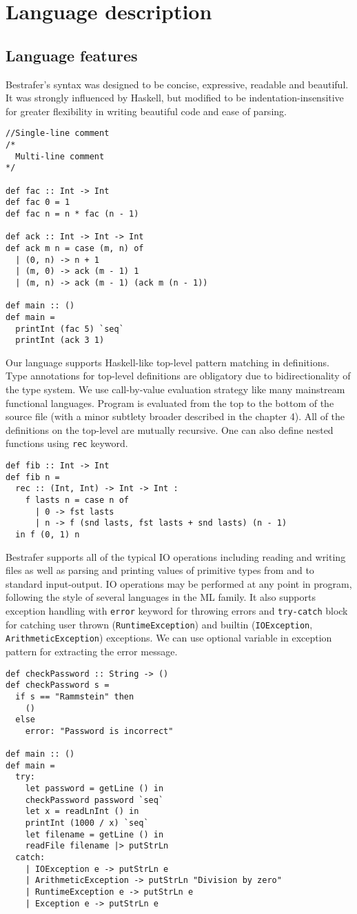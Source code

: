 \documentclass[declaration,shortabstract,english]{iithesis}
\begin{document}
\chapter{Language description}
\section{Language features}
Bestrafer's syntax was designed to be concise, expressive, readable and beautiful.
It was strongly influenced by Haskell, but modified to be indentation-insensitive for greater
flexibility in writing beautiful code and ease of parsing.
\begin{verbatim}
//Single-line comment
/*
  Multi-line comment
*/

def fac :: Int -> Int
def fac 0 = 1
def fac n = n * fac (n - 1)

def ack :: Int -> Int -> Int
def ack m n = case (m, n) of
  | (0, n) -> n + 1
  | (m, 0) -> ack (m - 1) 1
  | (m, n) -> ack (m - 1) (ack m (n - 1))

def main :: ()
def main =
  printInt (fac 5) `seq`
  printInt (ack 3 1)
\end{verbatim}
Our language supports Haskell-like top-level pattern matching in definitions. Type annotations
for top-level definitions are obligatory due to bidirectionality of the type system.
We use call-by-value evaluation strategy like many mainstream functional languages.
Program is evaluated from the top to the bottom of the source file
(with a minor subtlety broader described in the chapter 4). All of the definitions on the top-level
are mutually recursive. One can also define nested functions using \verb+rec+ keyword.
\begin{verbatim}
def fib :: Int -> Int
def fib n =
  rec :: (Int, Int) -> Int -> Int :
    f lasts n = case n of
      | 0 -> fst lasts
      | n -> f (snd lasts, fst lasts + snd lasts) (n - 1)
  in f (0, 1) n
\end{verbatim}

Bestrafer supports all of the typical IO operations including reading and writing files as well as
parsing and printing values of primitive types from and to standard input-output.
IO operations may be performed at any point in program, following the style of
several languages in the ML family. It also supports exception handling with \verb+error+
keyword for throwing errors and \verb+try-catch+ block for catching
user thrown (\verb+RuntimeException+) and builtin (\verb+IOException+,
\verb+ArithmeticException+) exceptions. We can use optional variable in exception pattern
for extracting the error message.
\begin{verbatim}
def checkPassword :: String -> ()
def checkPassword s =
  if s == "Rammstein" then
    ()
  else
    error: "Password is incorrect"

def main :: ()
def main =
  try:
    let password = getLine () in
    checkPassword password `seq`
    let x = readLnInt () in
    printInt (1000 / x) `seq`
    let filename = getLine () in
    readFile filename |> putStrLn
  catch:
    | IOException e -> putStrLn e
    | ArithmeticException -> putStrLn "Division by zero"
    | RuntimeException e -> putStrLn e
    | Exception e -> putStrLn e
\end{verbatim}
\end{document}

